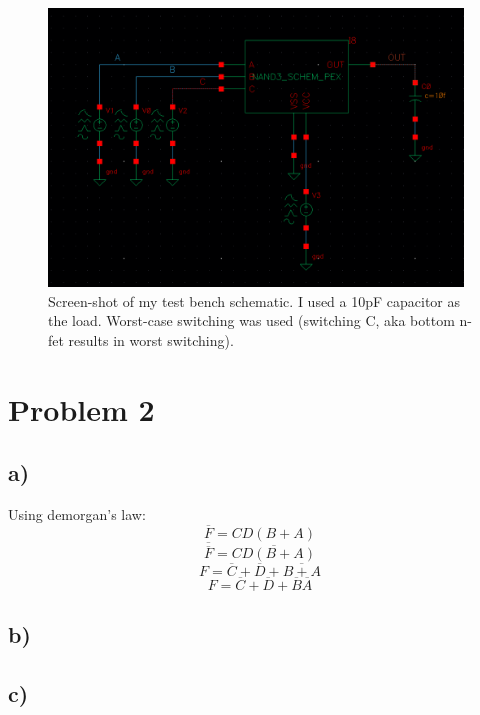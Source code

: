 \documentclass[11pt]{article}
\begin{document}
\begin{figure}[H]
  \includegraphics[width=0.98\textwidth]{schem.png}
  \caption{Screen-shot of my test bench schematic. I used a 10pF capacitor as the load. Worst-case switching was used (switching C, aka bottom n-fet results in worst switching).}
\end{figure}

\section{Problem 2}
\subsection{a)}
Using demorgan's law:
\[
\overline{F} = C D  (B + A)
\]
\[
\overline{\overline{F}} = \overline{C  D  (B + A)}
\]
\[
F = \overline{C} + \overline{D}  + \overline{B + A}
\]
\[
F = \overline{C} + \overline{D}  + \overline{B} \overline{A}
\]
\subsection{b)}

\subsection{c)}
\end{document}
